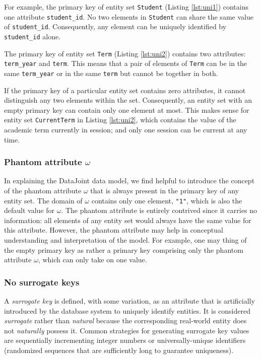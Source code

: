\documentclass[letter,10pt]{article}
\begin{document}
For example, the primary key of entity set \lstinline$Student$ (Listing \ref{lst:uni1}) contains one attribute \lstinline$student_id$.  
No two elements in \lstinline$Student$ can share the same value of \lstinline$student_id$. 
Consequently, any element can be uniquely identified by \lstinline$student_id$ alone. 

The primary key of entity set \lstinline$Term$ (Listing \ref{lst:uni2}) contains two attributes: \lstinline$term_year$ and \lstinline$term$.
This means that a pair of elements of \lstinline$Term$ can be in the same \lstinline$term_year$ or in the same \lstinline$term$ but cannot be together in both. 

If the primary key of a particular entity set contains zero attributes, it cannot distinguish any two elements within the set.  
Consequently, an entity set with an empty primary key can contain only one element at most.
This makes sense for entity set \lstinline$CurrentTerm$ in Listing \ref{lst:uni2}, which contains the value of the academic term currently in session; and only one session can be current at any time.

\subsubsection{Phantom attribute $\omega$}\label{sec:phantom}
In explaining the DataJoint data model, we find helpful to introduce the concept of the phantom attribute $\omega$ that is always present in the primary key of any entity set.  
The domain of $\omega$ contains only one element, \lstinline$"1"$, which is also the default value for $\omega$.
The phantom attribute is entirely contrived since it carries no information: all elements of any entity set would always have the same value for this attribute.
However, the phantom attribute may help in conceptual understanding and interpretation of the model.
For example, one may thing of the empty primary key as rather a primary key comprising only the phantom attribute $\omega$, which can only take on one value.
 
\subsubsection{No surrogate keys}
A \emph{surrogate key} is defined, with some variation, as an attribute that is artificially introduced by the database system to uniquely identify entities. 
It is considered \emph{surrogate} rather than \emph{natural} because the corresponding real-world entity does not \emph{naturally} possess it.
Common strategies for generating surrogate key values are sequentially incrementing integer numbers or universally-unique identifiers (randomized sequences that are sufficiently long to guarantee uniqueness).
\end{document}
